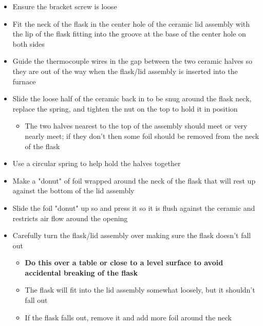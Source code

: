 \documentclass[letterpaper,11pt]{article}
\begin{document}
\begin{itemize}
\begin{itemize}
        \item Ensure the bracket screw is loose
        \item Fit the neck of the flask in the center hole of the ceramic lid 
            assembly with the lip of the flask fitting into the groove at the 
            base of the center hole on both sides
        \item Guide the thermocouple wires in the gap between the two ceramic 
            halves so they are out of the way when the flask/lid assembly is 
            inserted into the furnace
        \item Slide the loose half of the ceramic back in to be snug 
            around the flask neck, replace the spring, and tighten the nut on the top to hold it
            in position
                \begin{itemize}
                \item The two halves nearest to the top of the assembly should 
                    meet or very nearly meet; if they don't then some 
                    foil should be removed from the neck of the flask
                 \end{itemize}
        \item Use a circular spring to help hold the halves together
               
        
        \item Make a "donut" of foil wrapped around the neck of the flask that 
            will rest up against the bottom of the lid assembly
        \item Slide the foil "donut" up so and press it so it is flush against 
            the ceramic and restricts air flow around the opening
        \item Carefully turn the flask/lid assembly over making sure the flask 
            doesn't fall out
                \begin{itemize}
                \item \textbf{Do this over a table or close to a level surface 
                    to avoid accidental breaking of the flask}
                \item The flask will fit into the lid assembly somewhat loosely, 
                    but it shouldn't fall out
                \item If the flask falls out, remove it and add more foil 
                around the neck
                \end{itemize}
         

\end{itemize}
\end{itemize}
\end{document}
